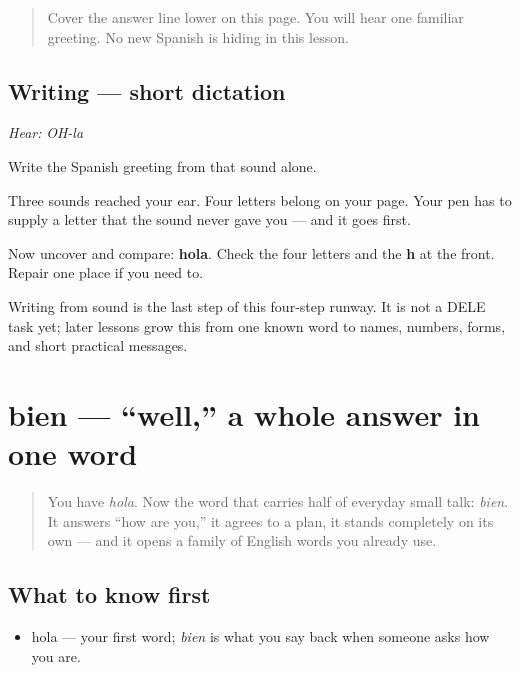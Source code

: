 \label{lesson:ES-W00-hola-dictation}



\begin{quote}
Cover the answer line lower on this page. You will hear one familiar greeting. No new Spanish is hiding in this lesson.
\end{quote}

\subsection*{Writing — short dictation}
\emph{Hear:} \emph{OH-la}

Write the Spanish greeting from that sound alone.

Three sounds reached your ear. Four letters belong on your page. Your pen has to supply a letter that the sound never gave you — and it goes first.

Now uncover and compare: \textbf{hola}. Check the four letters and the \textbf{h} at the front. Repair one place if you need to.

\begin{tcolorbox}[breakable,colback=teal!4,colframe=teal!35!black,title={Before you move on}]
Writing from sound is the last step of this four-step runway. It is not a DELE task yet; later lessons grow this from one known word to names, numbers, forms, and short practical messages.
\end{tcolorbox}
\section[bien]{bien — \textquotedblleft{}well,\textquotedblright{} a whole answer in one word}

\label{lesson:ES-C01-bien}



\begin{quote}
You have \emph{hola}. Now the word that carries half of everyday small talk: \emph{bien}. It answers \textquotedblleft{}how are you,\textquotedblright{} it agrees to a plan, it stands completely on its own — and it opens a family of English words you already use.
\end{quote}

\subsection*{What to know first}
\begin{itemize}
\raggedright
  \item hola — your first word; \emph{bien} is what you say back when someone asks how you are.
\end{itemize}

